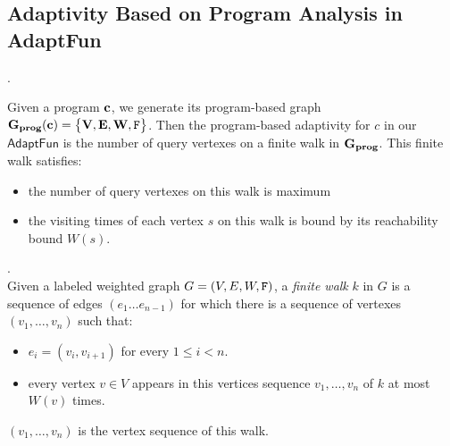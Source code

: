 \documentclass[a4paper,11pt]{article}
\newcommand{\THESYSTEM}{\textsf{AdaptFun}}
\begin{document}
\subsection{Adaptivity Based on Program Analysis in \THESYSTEM}
{
 \begin{defn}
.
\\
\end{defn} 
}
%
Given a program $\mathbf{{c}}$, we generate its program-based graph 
$\bf{G_{prog}}(\mathbf{{c}}) = \big\{ V, E, W, \mathtt{F} \big\}$.
%
Then the program-based adaptivity for $c$ in our $\THESYSTEM$ is the number of query vertexes on a finite walk in $\bf{G_{prog}}$. This finite walk satisfies:
\begin{itemize}
\item the number of query vertexes on this walk is maximum
\item the visiting times of each vertex $s$ on this walk is bound by its reachability bound $W(s)$.
\end{itemize}

\begin{defn}.
\\
Given a labeled weighted graph $G=(V,E,W,\mathtt{F} )$, a \emph{finite walk} $k$ in $G$ is a sequence of edges $(e_1 \ldots e_{n - 1})$ 
for which there is a sequence of vertexes $(v_1, \ldots, v_{n})$ such that:
\begin{itemize}
    \item $e_i = (v_{i},v_{i + 1})$ for every $1 \leq i < n$.
    \item every vertex $v \in V$ appears in this vertices sequence $v_1, \ldots, v_{n}$ of $k$ at most $W(v)$ times.  
\end{itemize}
$(v_1, \ldots, v_{n})$ is the vertex sequence of this walk.
\end{defn}
\end{document}
